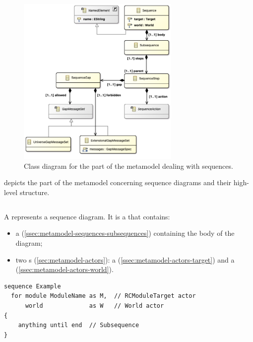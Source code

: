 \begin{figure}
	\centering
	\includegraphics[width=0.7\textwidth]{diagrams/sequences.png}
	\caption{Class diagram for the part of the \langname{} metamodel dealing with sequences.}
	\label{fig:metamodel-sequences}
\end{figure}

 depicts the part of the metamodel concerning
sequence diagrams and their high-level structure.

\subsection{\msequence}

A \msequence{} represents a sequence diagram.  It is a \mnamedelement{}
that contains:

\begin{itemize}
\item
	a \msubsequence{} (\cref{ssec:metamodel-sequences-subsequences})
	containing the body of the diagram;
\item
	two \mactor s (\cref{sec:metamodel-actors}):
	a \mtarget{} (\cref{ssec:metamodel-actors-target})
	and a \mworld{} (\cref{ssec:metamodel-actors-world}).
\end{itemize}

\begin{lstlisting}[style=Example]
sequence Example
  for module ModuleName as M,  // RCModuleTarget actor
      world             as W   // World actor
{
    anything until end  // Subsequence
}
\end{lstlisting}

